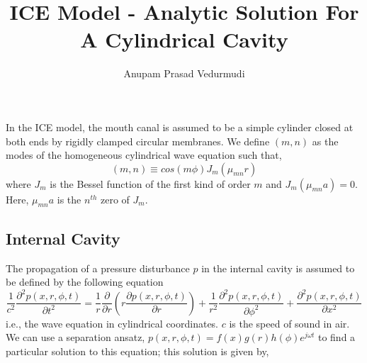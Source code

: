 \documentclass[a4paper,10pt]{article}
\title{ICE Model - Analytic Solution For A Cylindrical Cavity }
\author{Anupam Prasad Vedurmudi}
\date{}
\begin{document}
\maketitle
In the ICE model, the mouth canal is assumed to be a simple cylinder closed at 
both ends by rigidly clamped circular membranes. 
We define $(m,n)$ as the modes of the homogeneous cylindrical wave equation such that,
\begin{equation}\label{CylindricalHarmonic}
 (m,n)\equiv cos(m\phi)J_m\left(\mu_{mn}r\right)
\end{equation}
where $J_m$ is the Bessel function of the first kind of order $m$ and $J_m\left(\mu_{mn}a\right)=0$. 
Here, $\mu_{mn}a$ is the $n^{th}$ zero of $J_m$. 

\subsection{Internal Cavity}
The propagation of a pressure disturbance $p$ in the internal cavity is assumed to be defined by the following
equation
\begin{equation}\label{CavityCylindrical}
 \frac{1}{c^2}\frac{\partial^2p(x,r,\phi,t)}{\partial t^2}=\frac{1}{r}\frac{\partial}{\partial r}\left(r\frac{\partial p(x,r,\phi,t)}{\partial r}\right)+
 \frac{1}{r^2}\frac{\partial^2 p(x,r,\phi,t)}{\partial \phi^2}+\frac{\partial^2 p(x,r,\phi,t)}{\partial x^2}
\end{equation}
i.e., the wave equation in cylindrical coordinates. $c$ is the speed of sound in air. We can use a separation
ansatz, $p(x,r,\phi,t)=f(x)g(r)h(\phi)e^{j\omega t}$ to find a particular solution
to this equation; this solution is given by,
\end{document}
